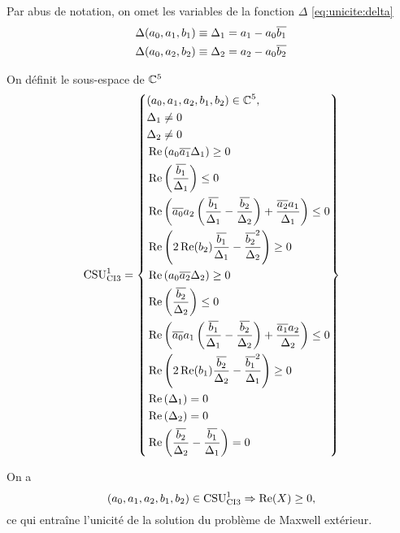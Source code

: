   Par abus de notation, on omet les variables de la fonction \(\Delta\) \eqref{eq:unicite:delta} 
  \begin{align*}
     \Delta(a_0,a_1,b_1) &\equiv \Delta_1 = a_1 - a_0\conj{b_1}
     \\
     \Delta(a_0,a_2,b_2) &\equiv \Delta_2 = a_2 - a_0\conj{b_2}
  \end{align*}

  \begin{defn}
    \label{def:csu:ci3-1}

    On définit le sous-espace de \(\CC^5\)
    \begin{equation*}
      \CSU[1]{CI3} = \left\lbrace 
      \begin{aligned}
      &(a_0,a_1,a_2,b_1,b_2) \in \CC^5,
      \\
      &\Delta_1 \not = 0
      \\
      &\Delta_2 \not = 0
      \\
      &\Re\left(a_0\conj{a_1}\Delta_1\right) \ge 0
      \\
      &\Re\left(\frac{\conj{b_1}}{\Delta_1}\right) \le 0
      \\
      &\Re\left(\conj{a_0}a_2\left(\frac{\conj{b_1}}{\Delta_1}-\frac{\conj{b_2}}{\Delta_2}\right) + \frac{\conj{a_2}a_1}{\Delta_1} \right)\le 0
      \\
      &\Re\left(2\Re(b_2)\frac{\conj{b_1}}{\Delta_1}-\frac{\conj{b_2}^2}{\Delta_2}\right) \ge 0
      \\
      &\Re\left(a_0\conj{a_2}\Delta_2\right) \ge 0
      \\
      &\Re\left(\frac{\conj{b_2}}{\Delta_2}\right) \le 0
      \\
      &\Re\left(\conj{a_0}a_1\left(\frac{\conj{b_1}}{\Delta_1}-\frac{\conj{b_2}}{\Delta_2}\right) + \frac{\conj{a_1}a_2}{\Delta_2} \right)\le 0
      \\
      &\Re\left(2\Re(b_1)\frac{\conj{b_2}}{\Delta_2}-\frac{\conj{b_1}^2}{\Delta_1}\right) \ge 0
      \\
      &\Re\left(\Delta_1\right) = 0
      \\
      &\Re\left(\Delta_2\right) = 0
      \\
      &\Re\left(\frac{\conj{b_2}}{\Delta_2}-\frac{\conj{b_1}}{\Delta_1}\right) = 0
      \end{aligned}
      \right\rbrace
    \end{equation*}
  \end{defn}
  
 \begin{prop}
    \label{prop:csu:ci3-1}
    On a 
    \begin{equation*}
      (a_0,a_1,a_2,b_1,b_2) \in \CSU[1]{CI3} \Rightarrow \Re(X)\ge 0,
    \end{equation*}
    ce qui entraîne l'unicité de la solution du problème de Maxwell extérieur.
  \end{prop}

